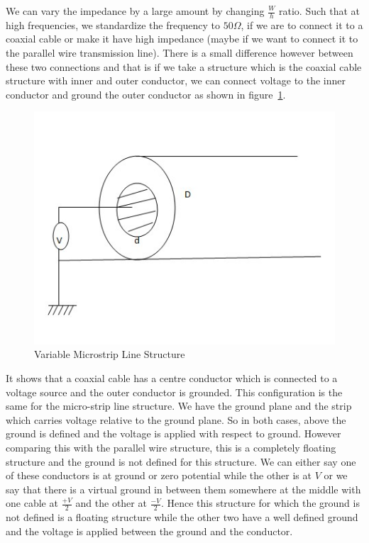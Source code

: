 We can vary the impedance by a large amount by changing $\frac{W}{h}$ ratio. Such that at high frequencies, we standardize the frequency to $50\varOmega$, if we are to connect it to a coaxial cable or make it have high impedance (maybe if we want to connect it to the parallel wire transmission line). There is a small difference however between these two connections and that is if we take a structure which is the coaxial cable structure with inner and outer conductor, we can connect voltage to the inner conductor and ground the outer conductor as shown in figure~\ref{fig:microstripvar}.
\begin{figure}[h]
\centering
\includegraphics[width=1\linewidth]{./graphics/ground}
\caption{Variable Microstrip Line Structure}
\label{fig:microstripvar}
\end{figure}

It shows that a coaxial cable has a centre conductor which is connected to a voltage source and the outer conductor is grounded. This configuration is the same for the micro-strip line structure. We have the ground plane and the strip which carries voltage relative to the ground plane. So in both cases, above the ground is defined and the voltage is applied with respect to ground. However comparing this with the parallel wire structure, this is a completely floating structure and the ground is not defined for this structure. We can either say one of these conductors is at ground or zero potential while the other is at $V$ or we say that there is a virtual ground in between them somewhere at the middle with one cable at $\frac{+V}{2}$ and the other at $\frac{-V}{2}$. Hence this structure for which the ground is not defined is a floating structure while the other two have a well defined ground and the voltage is applied between the ground and the conductor.

